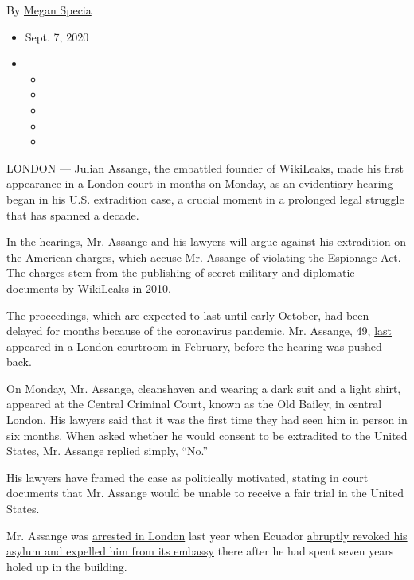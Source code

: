 By \href{https://www.nytimes3xbfgragh.onion/by/megan-specia}{Megan
Specia}

\begin{itemize}
\item
  Sept. 7, 2020
\item
  \begin{itemize}
  \item
  \item
  \item
  \item
  \item
  \end{itemize}
\end{itemize}

LONDON --- Julian Assange, the embattled founder of WikiLeaks, made his
first appearance in a London court in months on Monday, as an
evidentiary hearing began in his U.S. extradition case, a crucial moment
in a prolonged legal struggle that has spanned a decade.

In the hearings, Mr. Assange and his lawyers will argue against his
extradition on the American charges, which accuse Mr. Assange of
violating the Espionage Act. The charges stem from the publishing of
secret military and diplomatic documents by WikiLeaks in 2010.

The proceedings, which are expected to last until early October, had
been delayed for months because of the coronavirus pandemic. Mr.
Assange, 49,
\href{https://www.nytimes3xbfgragh.onion/2020/02/24/world/europe/julian-assange-extradition-trial.html}{last
appeared in a London courtroom in February}, before the hearing was
pushed back.

On Monday, Mr. Assange, cleanshaven and wearing a dark suit and a light
shirt, appeared at the Central Criminal Court, known as the Old Bailey,
in central London. His lawyers said that it was the first time they had
seen him in person in six months. When asked whether he would consent to
be extradited to the United States, Mr. Assange replied simply, ``No.''

His lawyers have framed the case as politically motivated, stating in
court documents that Mr. Assange would be unable to receive a fair trial
in the United States.

Mr. Assange was
\href{https://www.nytimes3xbfgragh.onion/2019/04/11/world/europe/julian-assange-wikileaks-ecuador-embassy.html}{arrested
in London} last year when Ecuador
\href{https://www.nytimes3xbfgragh.onion/2019/04/11/world/europe/julian-assange-ecuador-asylum.html}{abruptly
revoked his asylum and expelled him from its embassy} there after he had
spent seven years holed up in the building.

